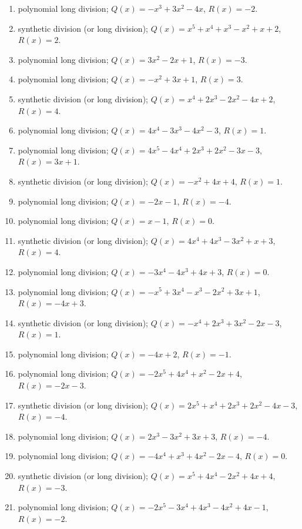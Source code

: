 \documentclass[11pt,oneside]{book}
\begin{document}
\begin{enumerate}[leftmargin=*,label=\textbf{Q\arabic*.},itemsep=0.45\baselineskip]
\item polynomial long division; $Q(x)=- x^{3} + 3 x^{2} - 4 x$, $R(x)=-2$.
\item synthetic division (or long division); $Q(x)=x^{5} + x^{4} + x^{3} - x^{2} + x + 2$, $R(x)=2$.
\item polynomial long division; $Q(x)=3 x^{2} - 2 x + 1$, $R(x)=-3$.
\item polynomial long division; $Q(x)=- x^{2} + 3 x + 1$, $R(x)=3$.
\item synthetic division (or long division); $Q(x)=x^{4} + 2 x^{3} - 2 x^{2} - 4 x + 2$, $R(x)=4$.
\item polynomial long division; $Q(x)=4 x^{4} - 3 x^{3} - 4 x^{2} - 3$, $R(x)=1$.
\item polynomial long division; $Q(x)=4 x^{5} - 4 x^{4} + 2 x^{3} + 2 x^{2} - 3 x - 3$, $R(x)=3 x + 1$.
\item synthetic division (or long division); $Q(x)=- x^{2} + 4 x + 4$, $R(x)=1$.
\item polynomial long division; $Q(x)=- 2 x - 1$, $R(x)=-4$.
\item polynomial long division; $Q(x)=x - 1$, $R(x)=0$.
\item synthetic division (or long division); $Q(x)=4 x^{4} + 4 x^{3} - 3 x^{2} + x + 3$, $R(x)=4$.
\item polynomial long division; $Q(x)=- 3 x^{4} - 4 x^{3} + 4 x + 3$, $R(x)=0$.
\item polynomial long division; $Q(x)=- x^{5} + 3 x^{4} - x^{3} - 2 x^{2} + 3 x + 1$, $R(x)=- 4 x + 3$.
\item synthetic division (or long division); $Q(x)=- x^{4} + 2 x^{3} + 3 x^{2} - 2 x - 3$, $R(x)=1$.
\item polynomial long division; $Q(x)=- 4 x + 2$, $R(x)=-1$.
\item polynomial long division; $Q(x)=- 2 x^{5} + 4 x^{4} + x^{2} - 2 x + 4$, $R(x)=- 2 x - 3$.
\item synthetic division (or long division); $Q(x)=2 x^{5} + x^{4} + 2 x^{3} + 2 x^{2} - 4 x - 3$, $R(x)=-4$.
\item polynomial long division; $Q(x)=2 x^{3} - 3 x^{2} + 3 x + 3$, $R(x)=-4$.
\item polynomial long division; $Q(x)=- 4 x^{4} + x^{3} + 4 x^{2} - 2 x - 4$, $R(x)=0$.
\item synthetic division (or long division); $Q(x)=x^{5} + 4 x^{4} - 2 x^{2} + 4 x + 4$, $R(x)=-3$.
\item polynomial long division; $Q(x)=- 2 x^{5} - 3 x^{4} + 4 x^{3} - 4 x^{2} + 4 x - 1$, $R(x)=-2$.

\end{enumerate}
\end{document}
